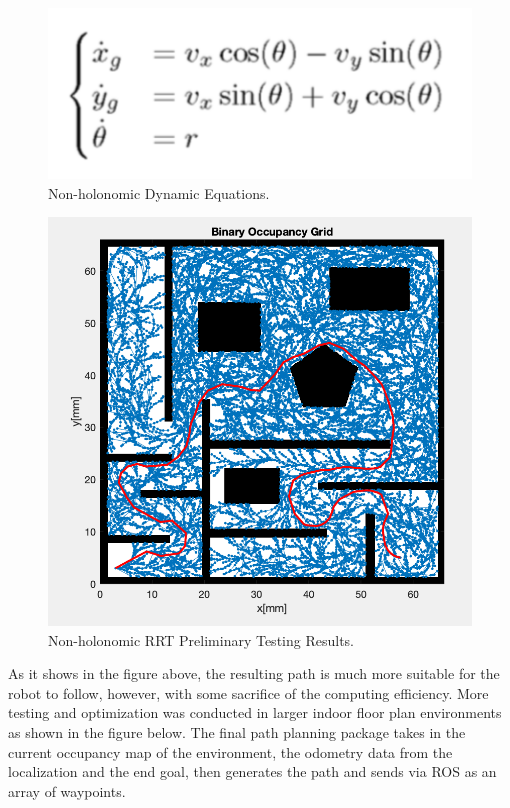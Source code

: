 \documentclass[11pt]{article}
\begin{document}
\begin{figure}[H]
    \centering
        \includegraphics[scale=.4, angle =0]{figures/rrt-3.png}
    \caption{Non-holonomic Dynamic Equations.}
    \label{Non-holonomic Dynamic Equations.}
\end{figure}

\begin{figure}[H]
    \centering
        \includegraphics[scale=.5, angle =0]{figures/rrt-4.png}
    \caption{Non-holonomic RRT Preliminary Testing Results.}
    \label{Non-holonomic RRT Preliminary Testing Results}
\end{figure}

As it shows in the figure above, the resulting path is much more suitable for the robot to follow, however, with some sacrifice of the computing efficiency. More testing and optimization was conducted in larger indoor floor plan environments as shown in the figure below. The final path planning package takes in the current occupancy map of the environment, the odometry data from the localization and the end goal, then generates the path and sends via ROS as an array of waypoints. 
\end{document}
